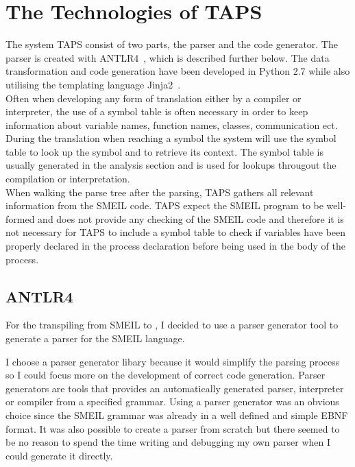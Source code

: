 \section{The Technologies of TAPS}
The system TAPS consist of two parts, the parser and the code generator. The parser is created with ANTLR4~\cite{antlr}, which is described further below. The data transformation and code generation have been developed in Python 2.7 while also utilising the templating language Jinja2~\cite{jinja2}.\\

Often when developing any form of translation either by a compiler or interpreter, the use of a symbol table is often necessary in order to keep information about variable names, function names, classes, communication ect. During the translation when reaching a symbol the system will use the symbol table to look up the symbol and to retrieve its context. The symbol table is usually generated in the analysis section and is used for lookups througout the compilation or interpretation. \\

When walking the parse tree after the parsing, TAPS gathers all relevant information from the SMEIL code. TAPS expect the SMEIL program to be well-formed and does not provide any checking of the SMEIL code and therefore it is not necessary for TAPS to include a symbol table to check if variables have been properly declared in the process declaration before being used in the body of the process.
\subsection{ANTLR4}
For the transpiling from SMEIL to \cspm{}, I decided to use a parser generator tool to generate a parser for the SMEIL language.

I choose a parser generator libary because it would simplify the parsing process so I could focus more on the development of correct code generation. Parser generators are tools that provides an automatically generated parser, interpreter or compiler from a specified grammar. Using a parser generator was an obvious choice since the SMEIL grammar was already in a well defined and simple EBNF format. It was also possible to create a parser from scratch but there seemed to be no reason to spend the time writing and debugging my own parser when I could generate it directly. \\

